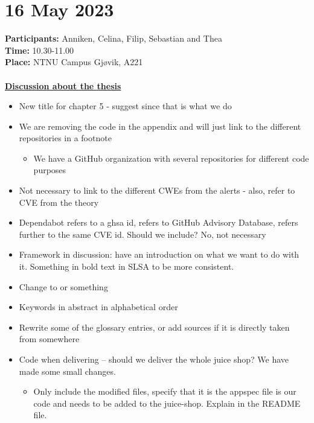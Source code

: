 \section{16 May 2023}
\textbf{Participants:} Anniken, Celina, Filip, Sebastian and Thea\\
\textbf{Time:} 10.30-11.00 \\
\textbf{Place:} NTNU Campus Gjøvik, A221
\\~\\
 \textbf{\underline{Discussion about the thesis}}
 \begin{itemize}
     \item New title for chapter 5 - suggest  since that is what we do
     \item We are removing the code in the appendix and will just link to the different repositories in a footnote
        \begin{itemize}
            \item We have a GitHub organization with several repositories for different code purposes
        \end{itemize}
    \item Not necessary to link to the different CWEs from the alerts - also, refer to CVE from the theory
    \item Dependabot refers to a ghsa id, refers to GitHub Advisory Database, refers further to the same CVE id. Should we include? No, not necessary 
    \item Framework in discussion: have an introduction on what we want to do with it. Something in bold text in SLSA to be more consistent.
    \item Change  to  or something 
    \item Keywords in abstract in alphabetical order 
    \item Rewrite some of the glossary entries, or add sources if it is directly taken from somewhere 
    \item Code when delivering – should we deliver the whole juice shop? We have made some small changes. 
        \begin{itemize}
            \item Only include the modified files, specify that it is the appspec file is our code and needs to be added to the juice-shop. Explain in the README file.
        \end{itemize}
 \end{itemize}




 

   